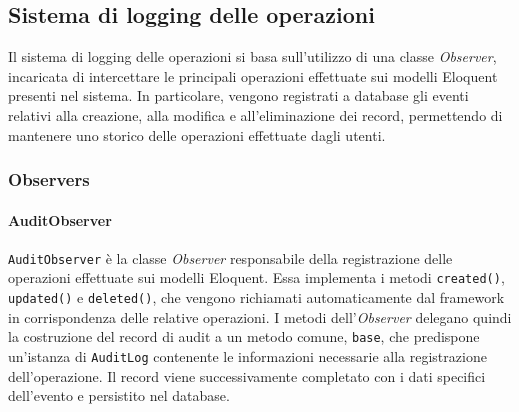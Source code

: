 \subsection{Sistema di logging delle operazioni}
Il sistema di logging delle operazioni si basa sull'utilizzo di una classe \textit{Observer}, incaricata di intercettare le principali operazioni effettuate sui modelli 
Eloquent presenti nel sistema. In particolare, vengono registrati a database gli eventi relativi alla creazione, alla modifica e all'eliminazione dei record, permettendo 
di mantenere uno storico delle operazioni effettuate dagli utenti.

\subsubsection{Observers}

\paragraph{AuditObserver}
\texttt{AuditObserver} è la classe \textit{Observer} responsabile della registrazione delle operazioni effettuate sui modelli Eloquent. Essa implementa i 
metodi \texttt{created()}, \texttt{updated()} e \texttt{deleted()}, che vengono richiamati automaticamente dal framework in corrispondenza delle relative operazioni.
I metodi dell'\textit{Observer} delegano quindi la costruzione del record di audit a un metodo comune, \texttt{base}, che predispone un'istanza di \texttt{AuditLog} contenente 
le informazioni necessarie alla registrazione dell'operazione. Il record viene successivamente completato con i dati specifici dell'evento e persistito nel database.

